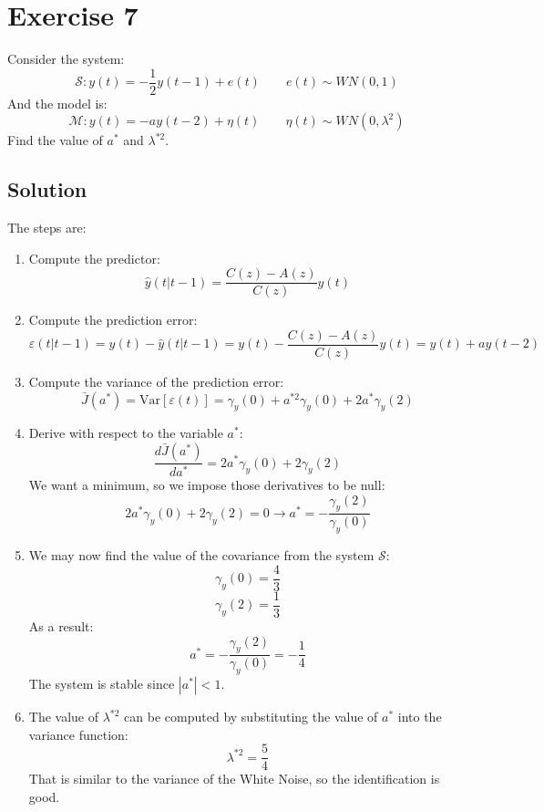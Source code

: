 \section{Exercise 7}

Consider the system: 
\[\mathcal{S}:y(t)=-\dfrac{1}{2}y(t-1)+e(t) \qquad e(t)\sim WN(0,1)\]
And the model is: 
\[\mathcal{M}:y(t)=-ay(t-2)+\eta(t) \qquad \eta(t)\sim WN(0,\lambda^2)\]
Find the value of $a^\ast$ and $\lambda^{\ast 2}$. 

\subsection*{Solution}
The steps are: 
\begin{enumerate}
    \item Compute the predictor: 
        \[\hat{y}(t|t-1)=\dfrac{C(z)-A(z)}{C(z)}y(t)\]
    \item Compute the prediction error: 
        \[\varepsilon(t|t-1)=y(t)-\hat{y}(t|t-1)=y(t)-\dfrac{C(z)-A(z)}{C(z)}y(t)=y(t)+ay(t-2)\]
    \item Compute the variance of the prediction error: 
        \[\bar{J}(a^\ast)=\text{Var}\left[\varepsilon(t)\right]=\gamma_y(0)+a^{\ast 2}\gamma_y(0)+2a^\ast \gamma_y(2)\]
    \item Derive with respect to the variable $a^\ast$: 
        \[\dfrac{d\bar{J}(a^\ast)}{d a^\ast}=2a^\ast\gamma_y(0)+2\gamma_y(2)\]
        We want a minimum, so we impose those derivatives to be null: 
        \[2a^\ast\gamma_y(0)+2\gamma_y(2)=0 \rightarrow a^\ast=-\dfrac{\gamma_y(2)}{\gamma_y(0)}\]
    \item We may now find the value of the covariance from the system $\mathcal{S}$: 
        \[\gamma_y(0)=\dfrac{4}{3}\]
        \[\gamma_y(2)=\dfrac{1}{3}\]
        As a result: 
        \[a^\ast=-\dfrac{\gamma_y(2)}{\gamma_y(0)}=-\dfrac{1}{4}\]
        The system is stable since $\left\lvert a^\ast \right\rvert<1$. 
    \item The value of $\lambda^{\ast 2}$ can be computed by substituting the value of $a^\ast$ into the variance function: 
        \[\lambda^{\ast 2}=\dfrac{5}{4}\]
        That is similar to the variance of the  White Noise, so the identification is good. 
\end{enumerate}